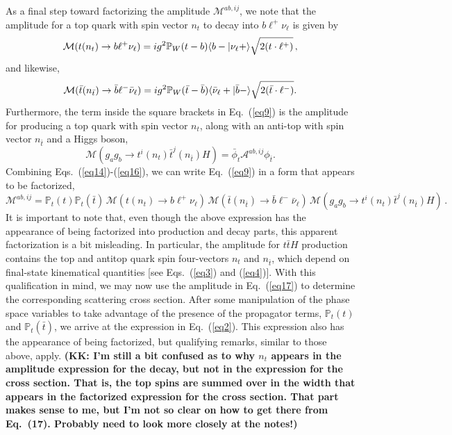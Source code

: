 \documentclass[aps,preprint,tightenlines,floatfix,superscriptaddress,nofootinbib,showpacs]{revtex4-1}
\def\beq{\begin{equation}}
\def\eeq{\end{equation}}
\def\tbar{\bar{t}}
\begin{document}
As a final step toward factorizing the amplitude $\mathcal{M}^{ab,ij}$,
we note that the amplitude for a top quark with spin vector
$n_t$ to decay into $b{\ell}^+\nu_{\ell}$ is given by
%
\beq
\label{eq14}
\mathcal{M}(t(n_t)\to b{\ell}^+\nu_{\ell})=ig^2\mathbb{P}_W(t-b)\langle b-|\nu_{\ell}+\rangle\sqrt{\strut2(t\cdot {\ell}^+)} \,,
\eeq
%
and likewise,
%
\beq
\label{eq15}
\mathcal{M}(\tbar(n_{\tbar})\to \bar{b}{\ell}^-\bar{\nu}_{\ell})=ig^2\mathbb{P}_W(\tbar-\bar{b})\langle \bar{\nu}_{\ell}+|\bar{b}-\rangle\sqrt{\strut2(\tbar\cdot {\ell}^-)}.
\eeq
%
Furthermore, the term inside the square brackets in
Eq.~(\ref{eq9}) is the amplitude for producing a top quark
with spin vector $n_t$, along with an anti-top with spin vector
$n_{\tbar}$ and a Higgs boson,
%
\beq
\label{eq16}
\mathcal{M}(g_ag_b \to t^i(n_t)\tbar^j(n_{\tbar})H)=\bar{\phi}_t \mathcal{A}^{ab,ij}\phi_{\tbar}.
\eeq
%
Combining Eqs.~(\ref{eq14})-(\ref{eq16}), we can write Eq.~(\ref{eq9})
in a form that appears to be factorized,
%
\beq
\label{eq17}
\mathcal{M}^{ab,ij}=\mathbb{P}_t(t)\mathbb{P}_t(\tbar)\,\mathcal{M}(t(n_t)\to b{\ell}^+\nu_{\ell})\,\mathcal{M}(\tbar(n_{\tbar})\to \bar{b}{\ell}^-\bar{\nu}_{\ell})\,\mathcal{M}(g_ag_b \to t^i(n_t)\tbar^j(n_{\tbar})H) \,.
\eeq
%
It is important
to note that, even though the above expression has the appearance of being
factorized into production and decay parts, this apparent
factorization is a bit misleading.  In particular, the amplitude for
$t\tbar H$ production contains the top and antitop quark
spin four-vectors $n_t$ and $n_{\tbar}$, which
depend on final-state kinematical quantities [see
Eqs.~(\ref{eq3}) and (\ref{eq4})].
With this qualification in mind, we may now use the
amplitude in Eq.~(\ref{eq17})
to determine the corresponding scattering cross section.
After some manipulation of the phase space variables
to take advantage of the presence of the
propagator terms, $\mathbb{P}_t(t)$ and $\mathbb{P}_t(\tbar)$,
we arrive at the expression in Eq.~(\ref{eq2}).  This expression
also has the appearance of being factorized, but
qualifying remarks, similar to those above, apply.
{\bf (KK: I'm still a bit confused as to why $n_t$ appears
  in the amplitude expression for the decay, but not
  in the expression for the cross section.  That is, the top
  spins are summed over in the width that appears in the
  factorized expression for the cross section.  That part makes
  sense to me, but I'm not so clear on how to get there from
  Eq.~(17).  Probably need to look more closely at the notes!)}
 

\setlength{\abovedisplayskip}{10.2pt}
\setlength{\belowdisplayskip}{10.2pt}
\end{document}
